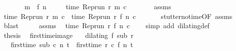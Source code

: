 \begin{isabellebody}
\ \ \ \ \ \ \ {\isacartoucheopen}m\ {\isachargreater}\ f\ n{\isacartoucheclose}\isanewline
\ \ \ \ \ {\isacartoucheopen}time\ {\isacharparenleft}{\isacharparenleft}Rep{\isacharunderscore}run\ r{\isacharparenright}\ m\ c{\isacharparenright}\ {\isacharequal}\ {\isasymtau}{\isacartoucheclose}\isanewline
%
\isadelimproof
%
\endisadelimproof
%
\isatagproof
{}\isamarkupfalse%
\ {\isacharminus}\isanewline
\ \ \isamarkupfalse%
\ assms{\isacharparenleft}{}{\isacharparenright}\ \isamarkupfalse%
\ {\isacartoucheopen}time\ {\isacharparenleft}{\isacharparenleft}Rep{\isacharunderscore}run\ r{\isacharparenright}\ m\ c{\isacharparenright}\ {\isacharequal}\ time\ {\isacharparenleft}{\isacharparenleft}Rep{\isacharunderscore}run\ r{\isacharparenright}\ {\isacharparenleft}f\ n{\isacharparenright}\ c{\isacharparenright}{\isacartoucheclose}\isanewline
\ \ \ \ \isamarkupfalse%
\ \ stutter{\isacharunderscore}no{\isacharunderscore}time{\isacharbrackleft}OF\ assms{\isacharparenleft}{}{\isacharcomma}{}{\isacharcomma}{}{\isacharparenright}{\isacharbrackright}\ \isamarkupfalse%
\ blast\isanewline
\ \ \isamarkupfalse%
\ \isamarkupfalse%
\ assms{\isacharparenleft}{}{\isacharcomma}{}{\isacharparenright}\ \isamarkupfalse%
\ {\isacartoucheopen}time\ {\isacharparenleft}{\isacharparenleft}Rep{\isacharunderscore}run\ r{\isacharparenright}\ {\isacharparenleft}f\ n{\isacharparenright}\ c{\isacharparenright}\ {\isacharequal}\ {\isasymtau}{\isacartoucheclose}\ \isamarkupfalse%
\ {\isacharparenleft}simp\ add{\isacharcolon}\ dilating{\isacharunderscore}def{\isacharparenright}\isanewline
\ \ \isamarkupfalse%
\ \isamarkupfalse%
\ {\isacharquery}thesis\ \isacommand{{\isachardot}}\isamarkupfalse%
\isanewline
{}\isamarkupfalse%
%
\endisatagproof
{\isafoldproof}%
%
\isadelimproof
\isanewline
%
\endisadelimproof
\isanewline
{}\isamarkupfalse%
\ first{\isacharunderscore}time{\isacharunderscore}image{\isacharcolon}\isanewline
\ \ \ {\isacartoucheopen}dilating\ f\ sub\ r{\isacartoucheclose}\isanewline
\ \ \ {\isacartoucheopen}first{\isacharunderscore}time\ sub\ c\ n\ t\ {\isacharequal}\ first{\isacharunderscore}time\ r\ c\ {\isacharparenleft}f\ n{\isacharparenright}\ t{\isacartoucheclose}\isanewline
%
\isadelimproof
%
\endisadelimproof
%
\isatagproof
{}\isamarkupfalse%

\end{isabellebody}
